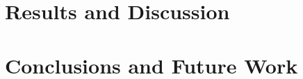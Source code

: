 \documentclass[conference]{IEEEtran}
\begin{document}
\section{Results and Discussion}





\section{Conclusions and Future Work}



\appendices





\end{document}
